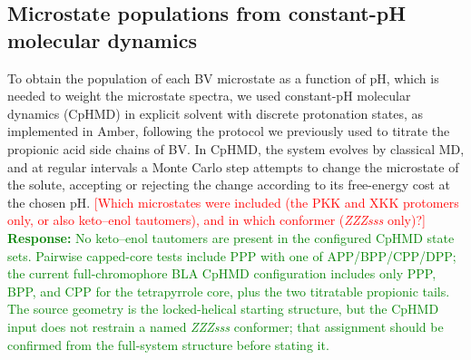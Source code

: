 \subsection{Microstate populations from constant-pH molecular dynamics}
\label{sec:cphmd}

To obtain the population of each BV microstate as a function of pH, which is needed to weight the microstate spectra, we used constant-pH molecular dynamics (CpHMD) in explicit solvent with discrete protonation states,\cite{swailsConstantPHReplica2014,pieriCpHMDThenQMMMIdentification2019} as implemented in Amber,\cite{caseAmber20252025} following the protocol we previously used to titrate the propionic acid side chains of BV.\cite{mainasBiliverdinsPropionicChains2024}
In CpHMD, the system evolves by classical MD, and at regular intervals a Monte Carlo step attempts to change the microstate of the solute, accepting or rejecting the change according to its free-energy cost at the chosen pH.
\textcolor{red}{[Which microstates were included (the PKK and XKK protomers only, or also keto--enol tautomers), and in which conformer (\textit{ZZZsss} only)?]}
\textcolor{green}{\textbf{Response:} No keto--enol tautomers are present in the configured CpHMD state sets. Pairwise capped-core tests include PPP with one of APP/BPP/CPP/DPP; the current full-chromophore BLA CpHMD configuration includes only PPP, BPP, and CPP for the tetrapyrrole core, plus the two titratable propionic tails. The source geometry is the locked-helical starting structure, but the CpHMD input does not restrain a named \textit{ZZZsss} conformer; that assignment should be confirmed from the full-system structure before stating it.}

